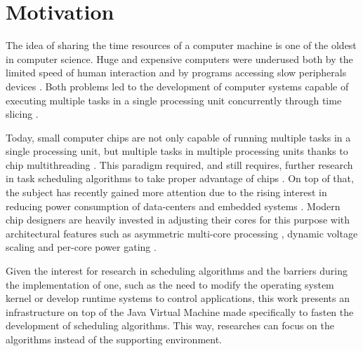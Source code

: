 


\section{Motivation}

The idea of sharing the time resources of a computer machine is one of the oldest in computer science. Huge and expensive computers were underused both by the limited speed of human interaction \cite{strachey1959time} and by programs accessing slow peripherals devices \cite{codd1960multiprogram}. Both problems led to the development of computer systems capable of executing multiple tasks in a single processing unit concurrently through time slicing \cite{corbato1962experimental,codd1959multiprogramming}.

Today, small computer chips are not only capable of running multiple tasks in a single processing unit, but multiple tasks in multiple processing units thanks to chip multithreading \cite{tullsen1995simultaneous,olukotun1996case}. This paradigm required, and still requires, further research in task scheduling algorithms to take proper advantage of chips \cite{fedorova2004chip}. On top of that, the subject has recently gained more attention due to the rising interest in reducing power consumption of data-centers and embedded systems \cite{mittal2014power,mittal2014survey}. Modern chip designers are heavily invested in adjusting their cores for this purpose \cite{greenhalgh2011big,fisher2005power} with architectural features such as asymmetric multi-core processing \cite{kumar2003single}, dynamic voltage scaling \cite{macken1990voltage} and per-core power gating \cite{leverich2009power}.

Given the interest for research in scheduling algorithms and the barriers during the implementation of one, such as the need to modify the operating system kernel or develop runtime systems to control applications, this work presents an infrastructure on top of the Java Virtual Machine made specifically to fasten the development of scheduling algorithms. This way, researches can focus on the algorithms instead of the supporting environment.


